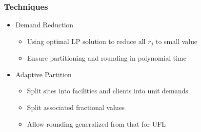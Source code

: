 \documentclass[handout, hyperref, xcolor=dvipsnames]{beamer}
\begin{document}
\begin{frame}
  \frametitle{Techniques}
  \begin{itemize}
  \item Demand Reduction
    \begin{itemize}
    \item Using optimal LP solution to reduce all $r_j$ to small value
    \item Ensure partitioning and rounding in polynomial time
    \end{itemize}
    
  \item Adaptive Partition
    \begin{itemize}
    \item Split sites into facilities and clients into unit demands
    \item Split associated fractional values
    \item Allow rounding generalized from that for UFL
    \end{itemize}
  \end{itemize}
\end{frame}
\end{document}
